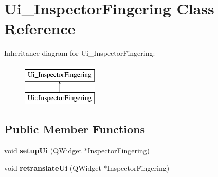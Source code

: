 \hypertarget{class_ui___inspector_fingering}{}\section{Ui\+\_\+\+Inspector\+Fingering Class Reference}
\label{class_ui___inspector_fingering}
Inheritance diagram for Ui\+\_\+\+Inspector\+Fingering\+:\begin{figure}[H]
\begin{center}
\leavevmode
\includegraphics[height=2.000000cm]{class_ui___inspector_fingering}
\end{center}
\end{figure}
\subsection*{Public Member Functions}
\begin{DoxyCompactItemize}
\item 
\mbox{\label{class_ui___inspector_fingering_ab16bcca61ad8031337cbf11b4571ad8c}} 
void {\bfseries setup\+Ui} (Q\+Widget $\ast$Inspector\+Fingering)
\item 
\mbox{\label{class_ui___inspector_fingering_ab8d9a5b649a4cdff7fd2dfa5f7a890a0}} 
void {\bfseries retranslate\+Ui} (Q\+Widget $\ast$Inspector\+Fingering)
\end{DoxyCompactItemize}
